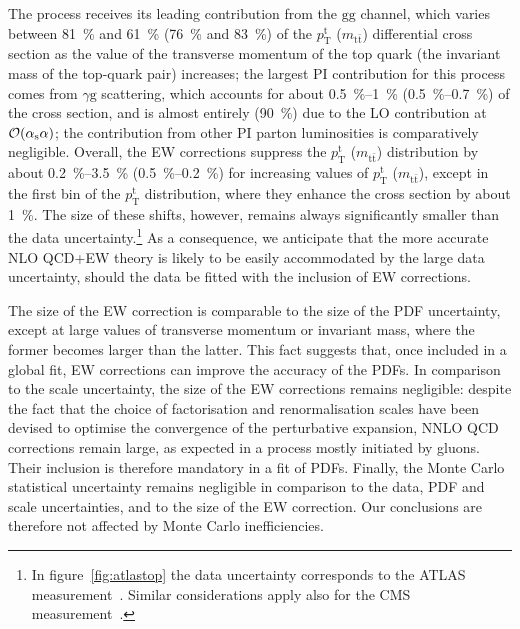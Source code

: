 The process receives its leading contribution from the $\mathrm{gg}$ channel,
which varies between \SI{81}{\percent} and \SI{61}{\percent} (\SI{76}{\percent} and \SI{83}{\percent}) of the $p_\mathrm{T}^\mathrm{t}$
($m_{\mathrm{t}\bar{\mathrm{t}}}$) differential cross section as the value of the
transverse momentum of the top quark (the invariant mass of the top-quark pair)
increases; the largest PI contribution for this process comes from $\gamma\mathrm{g}$ scattering,
which accounts for about \SIrange{0.5}{1}{\percent} (\SIrange{0.5}{0.7}{\percent}) of the cross
section, and is almost entirely (\SI{90}{\percent}) due to the LO contribution at $\mathcal{O}(\alpha_\mathrm{s}\alpha)$; the contribution from other PI parton luminosities is comparatively
negligible. Overall, the EW corrections suppress the $p_\mathrm{T}^\mathrm{t}$
($m_{\mathrm{t}\bar{\mathrm{t}}}$) distribution by about \SIrange{0.2}{3.5}{\percent}
(\SIrange{0.5}{0.2}{\percent}) for increasing values of $p_\mathrm{T}^\mathrm{t}$
($m_{\mathrm{t}\bar{\mathrm{t}}}$), except in the first bin of the
$p_\mathrm{T}^\mathrm{t}$ distribution, where they enhance the cross section by
about \SI{1}{\percent}. The size of these shifts, however, remains always significantly
smaller than the data uncertainty.\footnote{In
  figure~\ref{fig:atlastop} the data uncertainty corresponds to the ATLAS
  measurement~\cite{Aad:2015auj}. Similar considerations apply also for the CMS
  measurement~\cite{Khachatryan:2015oaa}.}
As a consequence, we anticipate that the more accurate NLO QCD+EW theory is
likely to be easily accommodated by the large data uncertainty, should the data
be fitted with the inclusion of EW corrections.

The size of the EW correction is comparable to the size of the PDF uncertainty,
except at large values of transverse momentum or invariant mass, where the
former becomes larger than the latter. This fact suggests that, once included in
a global fit, EW corrections can improve the accuracy of the PDFs. In comparison
to the scale uncertainty, the size of the EW corrections remains negligible:
despite the fact that the choice of factorisation and renormalisation scales
have been devised to optimise the convergence of the perturbative expansion,
NNLO QCD corrections remain large, as expected in a process mostly initiated
by gluons. Their inclusion is therefore mandatory in a fit of PDFs. Finally,
the Monte Carlo statistical uncertainty remains negligible in comparison to the
data, PDF and scale uncertainties, and to the size of the EW correction. Our
conclusions are therefore not affected by Monte Carlo inefficiencies.




